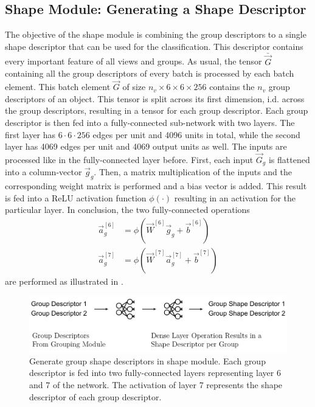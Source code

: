 \subsection{Shape Module: Generating a Shape Descriptor}
\label{sec:architecture-shape-module}
The objective of the shape module is combining the group descriptors to a single shape descriptor that can be used for the classification.
This descriptor contains every important feature of all views and groups.
As usual, the tensor $\bar{\vec{G}}$ containing all the group descriptors of every batch is processed by each batch element.
This batch element $\vec{G}$ of size $n_v \times 6 \times 6 \times 256$ contains the $n_v$ group descriptors of an object.
This tensor is split across its first dimension, i.d. across the group descriptors, resulting in a tensor for each group descriptor.
Each group descriptor is then fed into a fully-connected sub-network with two layers.
The first layer has $6\cdot6\cdot256$ edges per unit and 4096 units in total, while the second layer has 4069 edges per unit and 4069 output units as well.
The inputs are processed like in the fully-connected layer before.
First, each input $\vec{G}_g$ is flattened into a column-vector $\vec{g}_g$.
Then, a matrix multiplication of the inputs and the corresponding weight matrix is performed and a bias vector is added.
This result is fed into a ReLU activation function $\phi(\cdot)$ resulting in an activation for the particular layer.
In conclusion, the two fully-connected operations
\begin{subequations}
	\begin{align}
		\vec{a}^{[6]}_g &= \phi(\vec{W}^{[6]} \vec{g}_g + \vec{b}^{[6]}) \\
		\vec{a}^{[7]}_g &= \phi(\vec{W}^{[7]} \vec{a}^{[7]}_g + \vec{b}^{[7]})
	\end{align}
\end{subequations}
are performed as illustrated in .
\begin{figure}
	\centering
	\includegraphics[]{images/shape_module_group_shape.pdf}
	\caption[Generate group shape descriptors in shape module]{Generate group shape descriptors in shape module. Each group descriptor is fed into two fully-connected layers representing layer 6 and 7 of the network. The activation of layer 7 represents the shape descriptor of each group descriptor.}
	\label{fig:shape-module-group-shape}
\end{figure}
